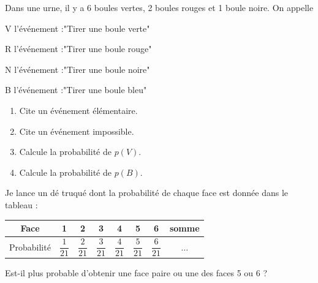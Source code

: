 \begin{pageParcourst}


Dans une urne, il y a 6 boules vertes, 2 boules rouges et 1 boule noire.
On appelle 
\begin{description}
\item V l'événement :"Tirer une boule verte"
\item R l'événement :"Tirer une boule rouge"
\item N l'événement :"Tirer une boule noire"
\item B l'événement :"Tirer une boule bleu"
\end{description}


\begin{enumerate}
\item Cite un événement élémentaire. 
\item Cite un événement impossible. 
\item Calcule la probabilité de $p(V)$. 
\item Calcule la probabilité de $p(B)$. 
\end{enumerate}



Je lance un dé truqué dont la probabilité de chaque face est donnée dans le tableau :

\begin{tabular}{|c|c|c|c|c|c|c|c|}
\hline 
Face & 1 & 2 & 3 & 4 & 5 & 6 & somme \\ 
\hline 
Probabilité & $\dfrac{1}{21}$ & $\dfrac{2}{21}$  & $\dfrac{3}{21}$  & $\dfrac{4}{21}$  & $\dfrac{5}{21}$  & $\dfrac{6}{21}$  & $\ldots$ \\ 
\hline 
\end{tabular}

Est-il plus probable d'obtenir une face paire ou une des faces 5 ou 6 ? 

 

\end{pageParcourst}
